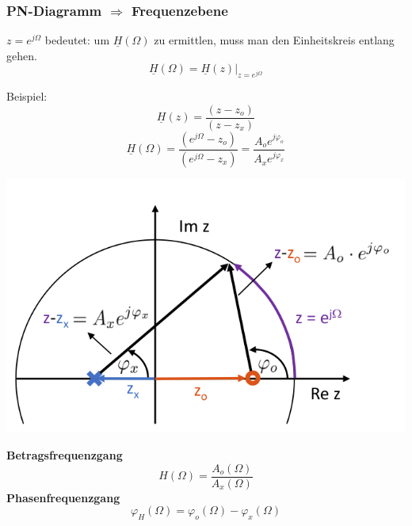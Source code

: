 \begin{multicols*}{2}
\subsubsection{PN-Diagramm $\Rightarrow$ Frequenzebene}
\begin{mdframed}[style=exercise]
	$z=e^{j\Omega}$ bedeutet: um $\underline{H}(\Omega)$ zu ermittlen, muss man
	den Einheitskreis entlang gehen.
	\[
		\underline{H}(\Omega)=\left.\underline{H}(z)\right|_{z=e^{j \Omega}}
	\]
\end{mdframed}
Beispiel:
\[
	\underline{H}(z)=\frac{\left(z-z_{o}\right)}{\left(z-z_{x}\right)}
\]
\[
	\underline{H}(\Omega)=\frac{\left(e^{j \Omega}-z_{o}\right)}{\left(e^{j \Omega}-z_{x}\right)}=\frac{A_{o} e^{j \varphi_{o}}}{A_{x} e^{j \varphi_{x}}}
\]

\centering
\includegraphics[width=0.7\columnwidth]{Bilder/PN-FreqGang}

\raggedright
\textbf{Betragsfrequenzgang}
\[
	H(\Omega)=\frac{A_{o}(\Omega)}{A_{x}(\Omega)}
\]
\textbf{Phasenfrequenzgang}
\[
	\varphi_{H}(\Omega)=\varphi_{o}(\Omega)-\varphi_{x}(\Omega)
\]


\end{multicols*}

